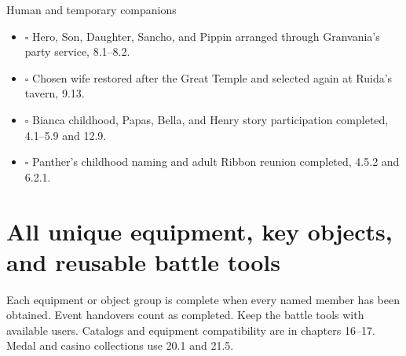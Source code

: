 \begin{routecheck}[breakable=false]{Human and temporary companions}
\begin{itemize}
\item \(\square\) Hero, Son, Daughter, Sancho, and Pippin arranged through Granvania's party service, 8.1--8.2.
\item \(\square\) Chosen wife restored after the Great Temple and selected again at Ruida's tavern, 9.13.
\item \(\square\) Bianca childhood, Papas, Bella, and Henry story participation completed, 4.1--5.9 and 12.9.
\item \(\square\) Panther's childhood naming and adult Ribbon reunion completed, 4.5.2 and 6.2.1.
\end{itemize}
\end{routecheck}

\section{All unique equipment, key objects, and reusable battle tools}
\label{completion-unique}

Each equipment or object group is complete when every named member has
been obtained. Event handovers count as completed. Keep the battle tools
with available users. Catalogs and equipment compatibility are in
chapters 16--17. Medal and casino collections use 20.1 and 21.5.

